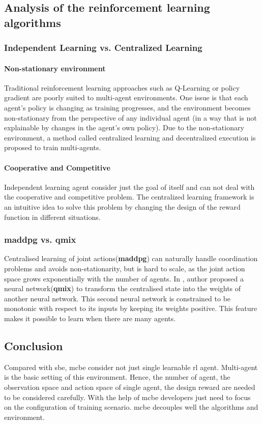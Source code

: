 \subsection{Analysis of the reinforcement learning algorithms}
\subsubsection{Independent Learning vs. Centralized Learning}
\paragraph{Non-stationary environment}
Traditional reinforcement learning approaches such as Q-Learning or policy gradient
are poorly suited to multi-agent environments. One issue is that each agent’s policy is changing as training progresses, and the environment becomes non-stationary from the perspective of any individual agent (in a way that is not explainable by changes in the agent’s own policy).
Due to the non-stationary environment, a method called centralized learning and decentralized execution is proposed to train multi-agents.
\paragraph{Cooperative and Competitive} Independent learning agent consider just the goal of itself and can not deal with the cooperative and competitive problem. The centralized learning framework is an intuitive idea to solve this problem by changing the design of the reward function in different situations.

\subsubsection{\gls{maddpg} vs. \gls{qmix}}
Centralised learning of joint actions(\textbf{\gls{maddpg}}) can naturally handle coordination problems and avoids non-stationarity, but is hard to scale, as the joint action space grows exponentially with the number of agents. In \parencite{Rashid2018}, author proposed a neural network(\textbf{\gls{qmix}}) to transform the centralised state into the weights of another neural network. This second neural network is constrained to be monotonic with respect to its inputs by keeping its weights positive. This feature makes it possible to learn when there are many agents.

\subsection{Conclusion}
Compared with \gls{sbe}, \gls{mcbe} consider not just single learnable \gls{rl} agent. Multi-agent is the basic setting of this environment. Hence, the number of agent, the observation space and action space of single agent, the design reward are needed to be considered carefully. With the help of \gls{mcbe} developers just need to focus on the configuration of training scenario. \gls{mcbe} decouples well the algorithms and environment. 